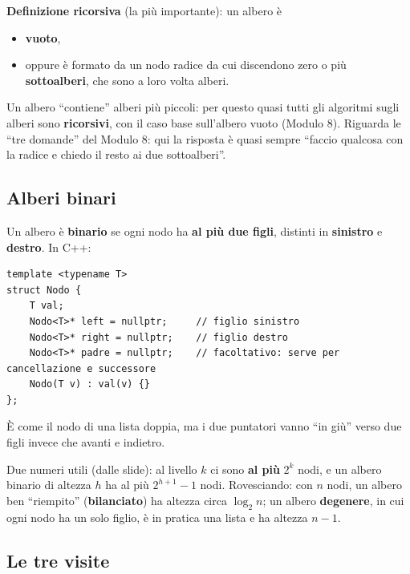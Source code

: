 \textbf{Definizione ricorsiva} (la più importante): un albero è
\begin{itemize}
  \item \textbf{vuoto},
  \item oppure è formato da un nodo radice da cui discendono zero o più
        \textbf{sottoalberi}, che sono a loro volta alberi.
\end{itemize}
Un albero ``contiene'' alberi più piccoli: per questo quasi tutti gli algoritmi sugli
alberi sono \textbf{ricorsivi}, con il caso base sull'albero vuoto (Modulo 8). Riguarda le
``tre domande'' del Modulo 8: qui la risposta è quasi sempre ``faccio qualcosa con la
radice e chiedo il resto ai due sottoalberi''.

\subsection*{Alberi binari}

Un albero è \textbf{binario} se ogni nodo ha \textbf{al più due figli}, distinti in
\textbf{sinistro} e \textbf{destro}. In C++:
\begin{lstlisting}
template <typename T>
struct Nodo {
    T val;
    Nodo<T>* left = nullptr;     // figlio sinistro
    Nodo<T>* right = nullptr;    // figlio destro
    Nodo<T>* padre = nullptr;    // facoltativo: serve per cancellazione e successore
    Nodo(T v) : val(v) {}
};
\end{lstlisting}
È come il nodo di una lista doppia, ma i due puntatori vanno ``in giù'' verso due figli
invece che avanti e indietro.

Due numeri utili (dalle slide): al livello $k$ ci sono \textbf{al più} $2^k$ nodi, e un
albero binario di altezza $h$ ha al più $2^{h+1} - 1$ nodi. Rovesciando: con $n$ nodi,
un albero ben ``riempito'' (\textbf{bilanciato}) ha altezza circa $\log_2 n$; un albero
\textbf{degenere}, in cui ogni nodo ha un solo figlio, è in pratica una lista e ha
altezza $n - 1$.

\subsection*{Le tre visite}

